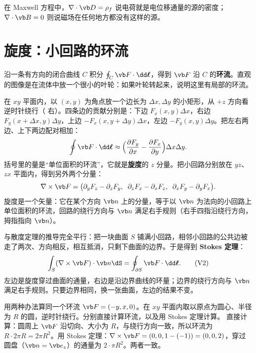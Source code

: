 在 Maxwell 方程中，$\nabla\cdot\vb D=\rho_f$ 说电荷就是电位移通量的源的密度；$\nabla\cdot\vb B=0$ 则说磁场在任何地方都没有这样的源。

\section{旋度：小回路的环流}\label{sec:calc-curl}

沿一条有方向的闭合曲线 $C$ 积分 $\oint_C\vb F\cdot\dd\boldsymbol\ell$，得到 $\vb F$ 沿 $C$ 的\textbf{环流}。直观的图像是在流体中放一个很小的叶轮：如果叶轮转起来，说明这里有局部的环流。

在 $xy$ 平面内，以 $(x,y)$ 为角点放一个边长为 $\Delta x,\Delta y$ 的小矩形，从 $+z$ 方向看逆时针绕行（ 右）。四条边的贡献分别是：下边 $F_x(x,y)\Delta x$，右边 $F_y(x+\Delta x,y)\Delta y$，上边 $-F_x(x,y+\Delta y)\Delta x$，左边 $-F_y(x,y)\Delta y$。把左右两边、上下两边配对相加：
\begin{equation*}
\oint\vb F\cdot\dd\boldsymbol\ell\approx\Bigl(\frac{\partial F_y}{\partial x}-\frac{\partial F_x}{\partial y}\Bigr)\Delta x\Delta y .
\end{equation*}
括号里的量是“单位面积的环流”，它就是\textbf{旋度}的 $z$ 分量。把小回路分别放在 $yz$、$zx$ 平面内，得到另外两个分量：
\begin{equation}
\nabla\times\vb F=\bigl(\partial_yF_z-\partial_zF_y,\;\;\partial_zF_x-\partial_xF_z,\;\;\partial_xF_y-\partial_yF_x\bigr).
\label{eq:calc-curldef}
\end{equation}
旋度是一个矢量：它在某个方向 $\vb n$ 上的分量，等于以 $\vb n$ 为法向的小回路上单位面积的环流，回路的绕行方向与 $\vb n$ 满足右手规则（右手四指沿绕行方向，拇指指向 $\vb n$）。

与散度定理的推导完全平行：把一块曲面 $S$ 铺满小回路，相邻小回路的公共边被走了两次、方向相反，相互抵消，只剩下曲面的边界。于是得到 \textbf{Stokes 定理}：
\begin{equation}
\int_S(\nabla\times\vb F)\cdot\vb n\dS=\oint_{\partial S}\vb F\cdot\dd\boldsymbol\ell.
\tag{V2}\label{id:stokes}
\end{equation}
左边是旋度穿过曲面的通量，右边是沿边界曲线的环量；边界的绕行方向与 $\vb n$ 满足右手规则。只要边界相同，换一张曲面，左边的结果不变。

\begin{example}[unbreakable]{用两种办法算同一个环流}\label{ex:calc-circle}
$\vb F=(-y,x,0)$。在 $xy$ 平面内取以原点为圆心、半径为 $R$ 的圆，逆时针绕行。分别直接计算环流，以及用 Stokes 定理计算。
\solution
直接计算：圆周上 $\vb F$ 沿切向、大小为 $R$，与绕行方向一致，所以环流为 $R\cdot2\pi R=2\pi R^2$。用 Stokes 定理：$\nabla\times\vb F=(0,0,1-(-1))=(0,0,2)$，穿过圆盘（$\vb n=\vb e_z$）的通量为 $2\cdot\pi R^2$。两者一致。
\end{example}

